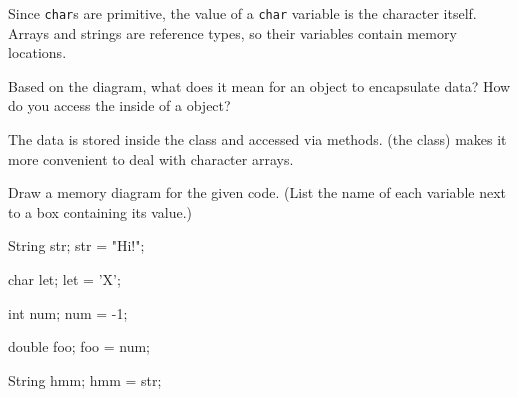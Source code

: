 \begin{answer}
Since {\tt char}s are primitive, the value of a {\tt char} variable is the character itself.
Arrays and strings are reference types, so their variables contain memory locations.
\end{answer}


\Q \label{encap}
Based on the diagram, what does it mean for an object to encapsulate data?
How do you access the  inside of a  object?

\begin{answer}
The data is stored inside the class and accessed via methods.
 (the class) makes it more convenient to deal with character arrays.
\end{answer}





\Q \label{diagram}
Draw a memory diagram for the given code.
(List the name of each variable next to a box containing its value.)

\hspace*{1em}
\begin{minipage}{0.25\linewidth}

\begin{javalst}
String str;
str = "Hi!";

char let;
let = 'X';

int num;
num = -1;

double foo;
foo = num;

String hmm;
hmm = str;
\end{javalst}

\end{minipage}
\begin{minipage}{0.65\linewidth}


\end{minipage}
\vspace{1ex}


